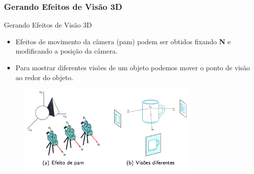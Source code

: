 \documentclass{beamer}
\begin{document}
\begin{frame}
\frametitle{Gerando Efeitos de Visão 3D}
	\begin{block}{Gerando Efeitos de Visão 3D}
		\begin{itemize}
			\item Efeitos de movimento da câmera (pam) podem ser obtidos fixando \textbf{N} e modificando a posição da câmera.
			\item Para mostrar diferentes visões de um objeto podemos mover o ponto de visão ao redor do objeto.
		\end{itemize}
	\end{block}
	
	\begin{figure}[!h]
			\begin{center}
			\includegraphics[width=0.8\textwidth]{Figures/camEfe}
			\end{center}
	\end{figure}
\end{frame}


\end{document}
